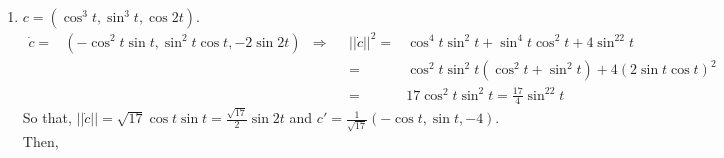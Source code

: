 \documentclass[12pt]{amsart}
\newcommand{\p}[1]{\item #1}
\begin{document}
\begin{enumerate}
{\begin{enumerate}
{\begin{align*}
	T'=&\frac{8t^4}{8t^4+a^4}\frac{8a^2t}{(8t^4+a^4)^2}\left(8t^4-a^4,4a^2t^2,4a^2t^2\right)
	\\=&\frac{64a^2t^5}{(8t^4+a^4)^3}\left(8t^4-a^4,4a^2t^2,4a^2t^2\right)
\end{align*}
So,
\begin{align*}
	\kappa=&||c''||=||T'||
	\\=&\left|\left|\frac{64a^2t^5}{(8t^4+a^4)^3}\left(8t^4-a^4,4a^2t^2,4a^2t^2\right)\right|\right|
	\\=&\frac{64a^2t^5}{(8t^4+a^4)^3}\left|\left|\left(8t^4-a^4,4a^2t^2,4a^2t^2\right)\right|\right|
	\\=&\frac{64a^2t^5}{(8t^4+a^4)^3}\sqrt{(8t^4-a^4)^2+16a^4t^4+16a^4t^4}
	\\=&\frac{64a^2t^5}{(8t^4+a^4)^3}\sqrt{64t^8-16a^4t^4+a^8+16a^4t^4+16a^4t^4}
	\\=&\frac{64a^2t^5}{(8t^4+a^4)^3}\sqrt{64t^8+16a^4t^4+a^8}
	\\=&\frac{64a^2t^5}{(8t^4+a^4)^3}\sqrt{(8t^4+a^4)^2}
	\\=&\frac{64a^2t^5}{(8t^4+a^4)^2}
\end{align*}
$T=\frac{1}{8t^4+a^4}\left(-4a^2t^2,-a^4,8t^4\right)$
\\$N=\frac{1}{8t^4+a^4}\left(8t^4-a^4,4a^2t^2,4a^2t^2\right)$.
\\So, $B=\frac{1}{(8t^4+a^4)^2}\left(-4a^6t^2-32a^2t^6,64t^8-8a^4t^4+16a^4t^4,-16a^4t^4+8a^4t^4-a^8\right)
\\=\frac{1}{(8t^4+a^4)^2}\left(-4a^2t^2(8t^4+a^4),8t^4(8t^4+a^4),-a^4(8t^4+a^4)\right)=\frac{1}{8t^4+a^4}\left(-4a^2t^2,8t^4,-a^4\right)$
\begin{align*}
	\tau B=&N'+\kappa T
	\\=&\left(\frac{T'}{\kappa}\right)'+\kappa T
	\\=&\left(\frac{1}{8t^4+a^4}\left(8t^4-a^4,4a^2t^2,4a^2t^2\right)\right)'+\kappa T
	\\=&\frac{-256t^7}{(8t^4+a^4)^3}\left(8t^4-a^4,4a^2t^2,4a^2t^2\right)+\frac{8t^4}{(8t^4+a^4)^2}\left(32t^3,8a^2t,8a^2t\right)+\frac{64a^2t^5}{(8t^4+a^4)^3}\left(-4a^2t^2,-a^4,8t^4\right)
	\\ =&\frac{8t^5}{(8t^4+a^4)^3}\left(-8a^2(-4a^2t^2),-8a^2(8t^4),-8a^2(-a^4) \right)
	\\=&\frac{-64a^2t^5}{(8t^4+a^4)^2}\left(\frac{1}{8t^4+a^4}\left(-4a^2t^2,8t^4,-a^4 \right)\right)=\frac{-64a^2t^5}{(8t^4+a^4)^2}B\Rightarrow\tau=\frac{-64a^2t^5}{(8t^4+a^4)^2}
\end{align*}}
\p{$c=(\cos^3t,\sin^3t,\cos2t)$.
\begin{align*}
	\dot c=&(-\cos^2t\sin t,\sin^2t\cos t,-2\sin2t) & \Rightarrow& & ||\dot c||^2=&\cos^4t\sin^2t+\sin^4t\cos^2t+4\sin^22t
	\\& & & & =&\cos^2t\sin^2t(\cos^2t+\sin^2t)+4(2\sin t\cos t)^2
	\\& & & & =&17\cos^2t\sin^2t=\frac{17}{4}\sin^22t
\end{align*}
So that, $||\dot c||=\sqrt{17}\cos t\sin t=\frac{\sqrt{17}}{2}\sin2t$ and $c'=\frac{1}{\sqrt{17}}\left(-\cos t,\sin t,-4\right)$. Then, }
\end{enumerate}}


\end{enumerate}
\end{document}
